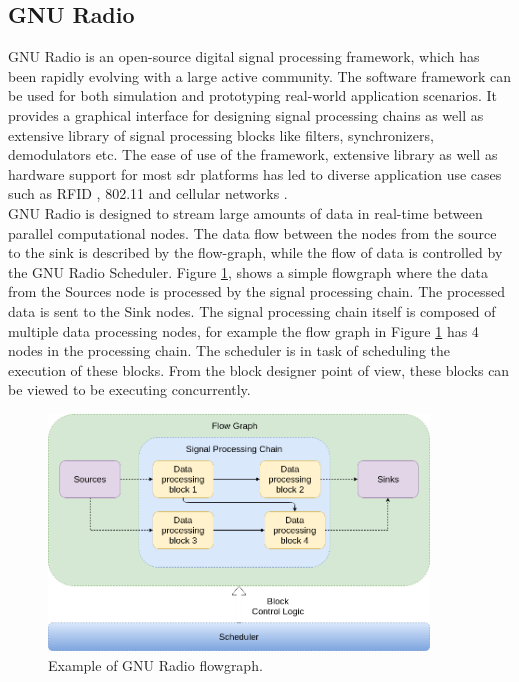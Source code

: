 \subsection{GNU Radio}

GNU Radio is an open-source digital signal processing framework, which has been rapidly evolving with a large active community.
The software framework can be used for both simulation and prototyping real-world application scenarios. 
It  provides a graphical interface for designing signal processing chains  as well as extensive library of signal processing blocks like filters, synchronizers, demodulators etc.
The ease of use of the framework, extensive library as well as hardware support for most \ac{sdr} platforms has led to diverse application use cases such as RFID \cite{buettner_software_2011}, 802.11 \cite{bloessl_towards_2013} and cellular networks \cite{demel_lte_2015}.\\


GNU Radio is designed to stream large amounts of data in real-time between parallel computational nodes.
The data flow between the nodes from the source to the sink is described by the flow-graph, while the flow of data is controlled by the GNU Radio Scheduler.
Figure \ref{gnuradio_arch}, shows a simple flowgraph where the data from the Sources node is processed by the signal processing chain.
The processed data is sent to the Sink nodes.
The signal processing chain itself is composed of multiple data processing nodes, for example the flow graph in Figure \ref{gnuradio_arch} has 4 nodes in the processing chain.
The scheduler is in task of scheduling the execution of these blocks. 
From the block designer point of view, these blocks can be viewed to be executing concurrently.

\begin{figure}[h!]
\centering
\includegraphics[width=0.9\textwidth]{Figure/GNURADIO_1.png}
\caption{Example of GNU Radio flowgraph.}
\label{gnuradio_arch}
\end{figure}

